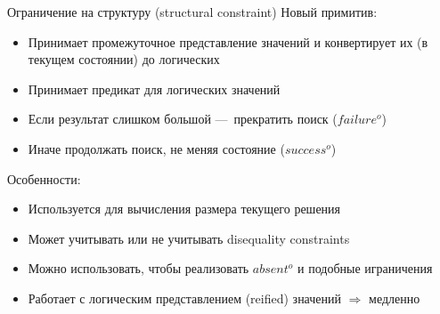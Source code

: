 \documentclass[aspectratio=169
  , xcolor={svgnames}
  , hyperref={ colorlinks,citecolor=Blue
             , linkcolor=DarkRed,urlcolor=DarkBlue}
  , russian
  ]{beamer}
\begin{document}
\begin{frame}[noframenumbering]{Ограничение на структуру (structural constraint)}
Новый примитив:
\begin{itemize}
\item Принимает промежуточное представление значений и конвертирует их (в текущем состоянии) до логических %
\item Принимает предикат для логических значений %
\item Если результат слишком большой ---~прекратить поиск%
($failure^o$)
\item Иначе продолжать поиск, не меняя состояние 
($success^o$)
\end{itemize}
\vspace{1em}
Особенности:
\begin{itemize}
\item Используется для вычисления размера текущего решения
\item Может учитывать или не учитывать disequality constraints
\item Можно использовать, чтобы реализовать $absent^o$ и подобные играничения
\item Работает с логическим представлением (reified) значений $\Rightarrow$ медленно
\end{itemize}
\end{frame}
\end{document}
